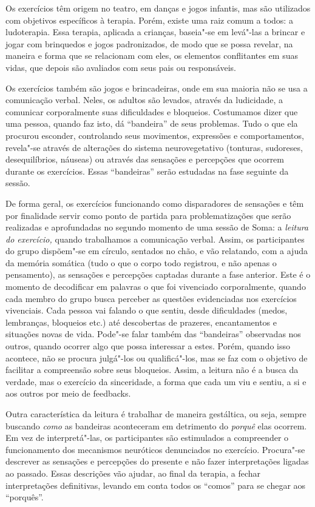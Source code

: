Os exercícios têm origem no teatro, em danças e jogos infantis, mas são
utilizados com objetivos específicos à terapia. Porém, existe uma raiz
comum a todos: a ludoterapia. Essa terapia, aplicada a crianças,
baseia"-se em levá"-las a brincar e jogar com brinquedos e jogos
padronizados, de modo que se possa revelar, na maneira e forma que se
relacionam com eles, os elementos conflitantes em suas vidas, que depois
são avaliados com seus pais ou responsáveis.

Os exercícios também são jogos e brincadeiras, onde em sua maioria não
se usa a comunicação verbal. Neles, os adultos são levados, através da
ludicidade, a comunicar corporalmente suas dificuldades e bloqueios.
Costumamos dizer que uma pessoa, quando faz isto, dá ``bandeira'' de
seus problemas. Tudo o que ela procurou esconder, controlando seus
movimentos, expressões e comportamentos, revela"-se através de alterações
do sistema neurovegetativo (tonturas, sudoreses, desequilíbrios,
náuseas) ou através das sensações e percepções que ocorrem durante os
exercícios. Essas ``bandeiras'' serão estudadas na fase seguinte da
sessão.

De forma geral, os exercícios funcionando como disparadores de sensações
e têm por finalidade servir como ponto de partida para problematizações
que serão realizadas e aprofundadas no segundo momento de uma sessão de
Soma: a \emph{leitura do exercício,} quando trabalhamos a comunicação
verbal. Assim, os participantes do grupo dispõem"-se em círculo, sentados
no chão, e vão relatando, com a ajuda da memória somática (tudo o que o
corpo todo registrou, e não apenas o pensamento), as sensações e
percepções captadas durante a fase anterior. Este é o momento de
decodificar em palavras o que foi vivenciado corporalmente, quando cada
membro do grupo busca perceber as questões evidenciadas nos exercícios
vivenciais. Cada pessoa vai falando o que sentiu, desde dificuldades
(medos, lembranças, bloqueios etc.) até descobertas de prazeres,
encantamentos e situações novas de vida. Pode"-se falar também das
``bandeiras'' observadas nos outros, quando ocorrer algo que possa
interessar a estes. Porém, quando isso acontece, não se procura
julgá"-los ou qualificá"-los, mas se faz com o objetivo de facilitar a
compreensão sobre seus bloqueios. Assim, a leitura não é a busca da
verdade, mas o exercício da sinceridade, a forma que cada um viu e
sentiu, a si e aos outros por meio de feedbacks.

Outra característica da leitura é trabalhar de maneira gestáltica, ou
seja, sempre buscando \emph{como} as bandeiras aconteceram em detrimento
do \emph{porquê} elas ocorrem. Em vez de interpretá"-las, os
participantes são estimulados a compreender o funcionamento dos
mecanismos neuróticos denunciados no exercício. Procura"-se descrever as
sensações e percepções do presente e não fazer interpretações ligadas ao
passado. Essas descrições vão ajudar, ao final da terapia, a fechar
interpretações definitivas, levando em conta todos os ``comos'' para se
chegar aos ``porquês''.

